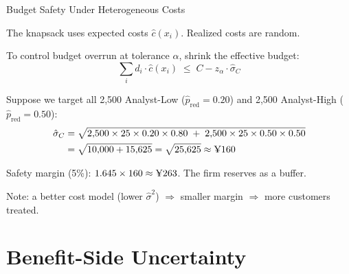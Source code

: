 \documentclass[aspectratio=169, 11pt, handout]{beamer}
\begin{document}
 
\begin{frame}{Budget Safety Under Heterogeneous Costs}
 
The knapsack uses expected costs $\hat{c}(x_i)$. Realized costs are random.
 
\medskip
 
To control budget overrun at tolerance $\alpha$, shrink the effective budget:
\[
\sum_{i} d_i \cdot \hat{c}(x_i) \;\leq\; C - z_\alpha \cdot \hat{\sigma}_C
\]
 
\pause
\medskip
 
Suppose we target all 2,500 Analyst-Low ($\hat{p}_{\text{red}} = 0.20$) and 2,500 Analyst-High ($\hat{p}_{\text{red}} = 0.50$):
\begin{align*}
\hat{\sigma}_C &= \sqrt{2{,}500 \times 25 \times 0.20 \times 0.80 \;+\; 2{,}500 \times 25 \times 0.50 \times 0.50} \\
&= \sqrt{10{,}000 + 15{,}625} = \sqrt{25{,}625} \approx \text{\textyen}160
\end{align*}
 
\pause
 
Safety margin (5\%): $1.645 \times 160 \approx \text{\textyen}263$. The firm reserves  as a buffer.
 
\medskip
 
Note: a better cost model (lower $\hat{\sigma}^2$) $\Rightarrow$ smaller margin $\Rightarrow$ more customers treated.
 
\end{frame}
 
 
\section{Benefit-Side Uncertainty}
 
\end{document}
